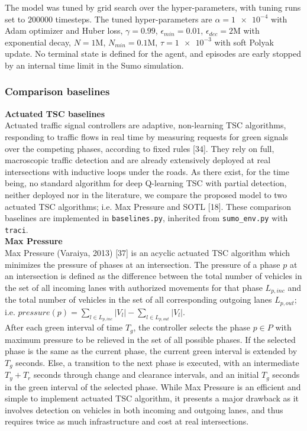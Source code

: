 \restoregeometry

\pagebreak

The model was tuned by grid search over the hyper-parameters, with tuning runs set to $200000$ timesteps. The tuned hyper-parameters are $\alpha=\num{1e-4}$ with Adam optimizer and Huber loss, $\gamma=0.99$, $\epsilon_{min}=0.01$, $\epsilon_{dec}=2$M with exponential decay, $N=1$M, $N_{min}=0.1$M, $\tau=\num{1e-3}$ with soft Polyak update. No terminal state is defined for the agent, and episodes are early stopped by an internal time limit in the Sumo simulation.

\subsubsection{Comparison baselines}

\textbf{Actuated TSC baselines}\\
Actuated traffic signal controllers are adaptive, non-learning TSC algorithms, responding to traffic flows in real time by measuring requests for green signals over the competing phases, according to fixed rules [34]. They rely on full, macroscopic traffic detection and are already extensively deployed at real intersections with inductive loops under the roads. 
As there exist, for the time being, no standard algorithm for deep Q-learning TSC with partial detection, neither deployed nor in the literature, we compare the proposed model to two actuated TSC algorithms; i.e. Max Pressure and SOTL [18]. These comparison baselines are implemented in \texttt{baselines.py}, inherited from \texttt{sumo\_env.py} with \texttt{traci}. \\

\textbf{Max Pressure}\\
Max Pressure (Varaiya, 2013) [37] is an acyclic actuated TSC algorithm which minimizes the pressure of phases at an intersection. The pressure of a phase $p$ at an intersection is defined as the difference between the total number of vehicles in the set of all incoming lanes with authorized movements for that phase $L_{p,inc}$ and the total number of vehicles in the set of all corresponding outgoing lanes $L_{p,out}$; i.e. $pressure(p) = \sum_{l \in L_{p,inc}} |V_l| - \sum_{l \in L_{p,out}} |V_l|$. \\
After each green interval of time $T_g$, the controller selects the phase $p \in P$ with maximum pressure to be relieved in the set of all possible phases. If the selected phase is the same as the current phase, the current green interval is extended by $T_g$ seconds. Else, a transition to the next phase is executed, with an intermediate $T_y + T_r$ seconds through change and clearance intervals, and an initial $T_g$ seconds in the green interval of the selected phase. While Max Pressure is an efficient and simple to implement actuated TSC algorithm, it presents a major drawback as it involves detection on vehicles in both incoming and outgoing lanes, and thus requires twice as much infrastructure and cost at real intersections. \\

